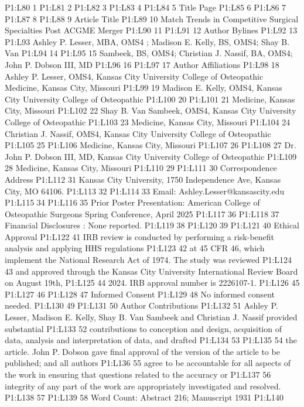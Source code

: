 P1:L80 1 P1:L81 2 P1:L82 3 P1:L83 4 P1:L84 5 Title Page P1:L85 6 P1:L86
7 P1:L87 8 P1:L88 9 Article Title P1:L89 10 Match Trends in Competitive
Surgical Specialties Post ACGME Merger P1:L90 11 P1:L91 12 Author
Bylines P1:L92 13 P1:L93 Ashley P. Lesser, MBA, OMS4 ; Madison E. Kelly,
BS, OMS4; Shay B. Van P1:L94 14 P1:L95 15 Sambeek, BS, OMS4; Christian
J. Nassif, BA, OMS4; John P. Dobson III, MD P1:L96 16 P1:L97 17 Author
Affiliations P1:L98 18 Ashley P. Lesser, OMS4, Kansas City University
College of Osteopathic Medicine, Kansas City, Missouri P1:L99 19 Madison
E. Kelly, OMS4, Kansas City University College of Osteopathic P1:L100 20
P1:L101 21 Medicine, Kansas City, Missouri P1:L102 22 Shay B. Van
Sambeek, OMS4, Kansas City University College of Osteopathic P1:L103 23
Medicine, Kansas City, Missouri P1:L104 24 Christian J. Nassif, OMS4,
Kansas City University College of Osteopathic P1:L105 25 P1:L106
Medicine, Kansas City, Missouri P1:L107 26 P1:L108 27 Dr. John P. Dobson
III, MD, Kansas City University College of Osteopathic P1:L109 28
Medicine, Kansas City, Missouri P1:L110 29 P1:L111 30 Correspondence
Address P1:L112 31 Kansas City University, 1750 Independence Ave, Kansas
City, MO 64106. P1:L113 32 P1:L114 33 Email:
Ashley.Lesser@kansascity.edu P1:L115 34 P1:L116 35 Prior Poster
Presentation: American College of Osteopathic Surgeons Spring
Conference, April 2025 P1:L117 36 P1:L118 37 Financial Disclosures :
None reported. P1:L119 38 P1:L120 39 P1:L121 40 Ethical Approval P1:L122
41 IRB review is conducted by performing a risk-benefit analysis and
applying HHS regulations P1:L123 42 at 45 CFR 46, which implement the
National Research Act of 1974. The study was reviewed P1:L124 43 and
approved through the Kansas City University International Review Board
on August 19th, P1:L125 44 2024. IRB approval number is 2226107-1.
P1:L126 45 P1:L127 46 P1:L128 47 Informed Consent P1:L129 48 No informed
consent needed. P1:L130 49 P1:L131 50 Author Contributions P1:L132 51
Ashley P. Lesser, Madison E. Kelly, Shay B. Van Sambeek and Christian J.
Nassif provided substantial P1:L133 52 contributions to conception and
design, acquisition of data, analysis and interpretation of data, and
drafted P1:L134 53 P1:L135 54 the article. John P. Dobson gave final
approval of the version of the article to be published; and all authors
P1:L136 55 agree to be accountable for all aspects of the work in
ensuring that questions related to the accuracy or P1:L137 56 integrity
of any part of the work are appropriately investigated and resolved.
P1:L138 57 P1:L139 58 Word Count: Abstract 216; Manuscript 1931 P1:L140
